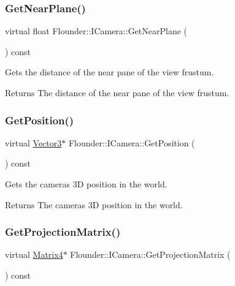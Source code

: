 \subsubsection{\texorpdfstring{Get\+Near\+Plane()}{GetNearPlane()}}
{\footnotesize\ttfamily virtual float Flounder\+::\+I\+Camera\+::\+Get\+Near\+Plane (\begin{DoxyParamCaption}{ }\end{DoxyParamCaption}) const\hspace{0.3cm}{\ttfamily [pure virtual]}}



Gets the distance of the near pane of the view frustum. 

\begin{DoxyReturn}{Returns}
The distance of the near pane of the view frustum. 
\end{DoxyReturn}
\mbox{\label{class_flounder_1_1_i_camera_ad28eeed8a4c9c53138c257242f423a28}} 
\subsubsection{\texorpdfstring{Get\+Position()}{GetPosition()}}
{\footnotesize\ttfamily virtual \hyperlink{class_flounder_1_1_vector3}{Vector3}$\ast$ Flounder\+::\+I\+Camera\+::\+Get\+Position (\begin{DoxyParamCaption}{ }\end{DoxyParamCaption}) const\hspace{0.3cm}{\ttfamily [pure virtual]}}



Gets the cameras 3D position in the world. 

\begin{DoxyReturn}{Returns}
The cameras 3D position in the world. 
\end{DoxyReturn}
\mbox{\label{class_flounder_1_1_i_camera_a1cb26d06f1334e892e418bd72d317280}} 
\subsubsection{\texorpdfstring{Get\+Projection\+Matrix()}{GetProjectionMatrix()}}
{\footnotesize\ttfamily virtual \hyperlink{class_flounder_1_1_matrix4}{Matrix4}$\ast$ Flounder\+::\+I\+Camera\+::\+Get\+Projection\+Matrix (\begin{DoxyParamCaption}{ }\end{DoxyParamCaption}) const\hspace{0.3cm}{\ttfamily [pure virtual]}}




